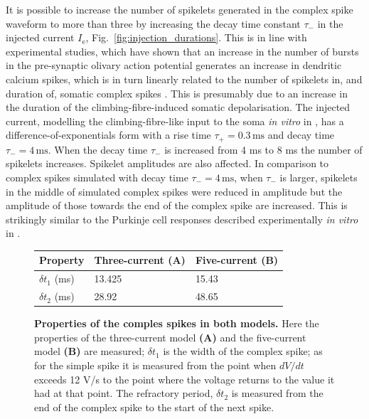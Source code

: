\documentclass[twocolumn]{svjour3}          %
\newcommand{\mse}{\,\mathrm{ms}}
\begin{document}
It is possible to increase the number of spikelets generated in the
complex spike waveform to more than three by increasing the decay time
constant $\tau_-$ in the injected current $I_{\mathrm{e}}$,
Fig.~\ref{fig:injection_durations}. This is in line with experimental
studies, which have shown that an increase in the number of bursts in
the pre-synaptic olivary action potential generates an increase in
dendritic calcium spikes, which is in turn linearly related to the
number of spikelets in, and duration of, somatic complex spikes
\citep{MathyEtAl2009}. This is presumably due to an increase in the
duration of the climbing-fibre-induced somatic depolarisation.  The
injected current, modelling the climbing-fibre-like input to the soma
\textsl{in vitro} in \citet{DavieEtAl2008}, has a
difference-of-exponentials form with a rise time $\tau_+=0.3\mse$ and
decay time $\tau_-=4\mse$. When the decay time $\tau_-$ is increased
from 4 ms to 8 ms the number of spikelets increases. Spikelet
amplitudes are also affected. In comparison to complex spikes
simulated with decay time $\tau_- = 4\mse$, when $\tau_-$ is larger,
spikelets in the middle of simulated complex spikes were reduced in
amplitude but the amplitude of those towards the end of the complex
spike are increased.  This is strikingly similar to the Purkinje cell
responses described experimentally \textsl{in vitro} in
\citet{MonsivaisEtAl2005}.

\begin{figure}[!ht]

\caption{\textbf{Properties of the comples spikes in both models.}
  Here the properties of the three-current model \textbf{(A)} and the
  five-current model \textbf{(B)} are measured; $\delta t_1$ is the
  width of the complex spike; as for the simple spike it is measured
  from the point when $dV/dt$ exceeds 12 V/s to the point where the
  voltage returns to the value it had at that point. The refractory
  period, $\delta t_2$ is measured from the end of the complex spike
  to the start of the next spike.}
  \begin{center} 
    \begin{tabular}{|l l l|}
      \hline
      Property & Three-current (\textbf{A}) & Five-current (\textbf{B})\\ \hline
      $\delta t_1$ (ms)& 13.425&15.43\\
      $\delta t_2$ (ms)&28.92&48.65\\
      \hline
    \end{tabular}
    \end{center}
\label{fig_cs_properties}
\end{figure}
\end{document}
